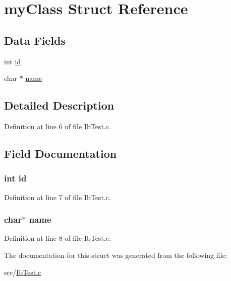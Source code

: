 \hypertarget{structmy_class}{
\section{myClass Struct Reference}
\label{structmy_class}
}
\subsection*{Data Fields}
\begin{DoxyCompactItemize}
\item 
int \hyperlink{structmy_class_a7441ef0865bcb3db9b8064dd7375c1ea}{id}
\item 
char $\ast$ \hyperlink{structmy_class_a5ac083a645d964373f022d03df4849c8}{name}
\end{DoxyCompactItemize}


\subsection{Detailed Description}


Definition at line 6 of file IbTest.c.



\subsection{Field Documentation}
\hypertarget{structmy_class_a7441ef0865bcb3db9b8064dd7375c1ea}{
\subsubsection[{id}]{\setlength{\rightskip}{0pt plus 5cm}int {\bf id}}}
\label{structmy_class_a7441ef0865bcb3db9b8064dd7375c1ea}


Definition at line 7 of file IbTest.c.

\hypertarget{structmy_class_a5ac083a645d964373f022d03df4849c8}{
\subsubsection[{name}]{\setlength{\rightskip}{0pt plus 5cm}char$\ast$ {\bf name}}}
\label{structmy_class_a5ac083a645d964373f022d03df4849c8}


Definition at line 8 of file IbTest.c.



The documentation for this struct was generated from the following file:\begin{DoxyCompactItemize}
\item 
src/\hyperlink{_ib_test_8c}{IbTest.c}\end{DoxyCompactItemize}
